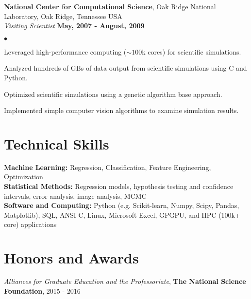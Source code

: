 \documentclass[margin,line, 11pt]{res}
\newenvironment{list2}{
  \begin{list}{$\bullet$}{%
      \setlength{\itemsep}{0in}
      \setlength{\parsep}{0in} \setlength{\parskip}{0in}
      \setlength{\topsep}{0in} \setlength{\partopsep}{0in} 
      \setlength{\leftmargin}{0.2in}}}{\end{list}}
\begin{document}
\begin{resume}
\textbf{National Center for Computational Science}, Oak Ridge National Laboratory, Oak Ridge, Tennessee USA\\
\textit{Visiting Scientist} \hfill \textbf{May, 2007 - August, 2009}\\
    \begin{list2}
    	\vspace*{-5mm}
    	\item Leveraged high-performance computing ($\sim 100$k cores) for scientific simulations.
    	\item Analyzed hundreds of GBs of data output from scientific simulations using C and Python.
    	\item Optimized scientific simulations using a genetic algorithm base approach.
    	\item Implemented simple computer vision algorithms to examine simulation results.
    \end{list2}
\vspace*{-5mm}

\section{Technical Skills}
\textbf{Machine Learning:} Regression, Classification, Feature Engineering, Optimization\\
\textbf{Statistical Methods:} Regression models, hypothesis testing and confidence intervals, error analysis, image analysis, MCMC\\
\textbf{Software and Computing:}  Python (e.g. Scikit-learn, Numpy, Scipy, Pandas, Matplotlib), SQL, ANSI C, Linux, Microsoft Excel, GPGPU, and HPC (100k+ core) applications\\
\vspace*{-5mm}

\section{Honors and Awards}
\textit{Alliances for Graduate Education and the Professoriate}, \textbf{The National Science Foundation}, \hfill 2015 - 2016

\end{resume}
\end{document}
